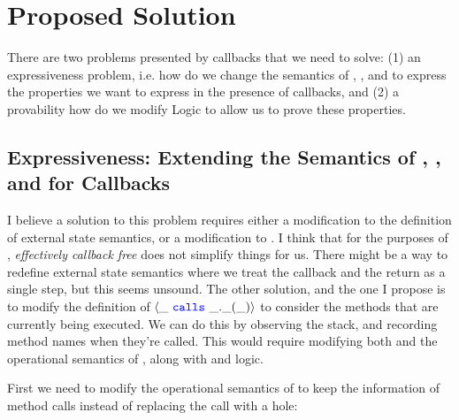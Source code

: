 \documentclass[11pt]{article} %
\begin{document}
\section{Proposed Solution}
There are two problems presented by callbacks that we need 
to solve: (1) an expressiveness problem, i.e. how do we change 
the semantics of \Loo, \SpecO, and \Nec to express the properties
we want to express in the presence of callbacks, and (2) a provability
how do we modify \Nec Logic to allow us to prove these properties.

\subsection{Expressiveness: Extending the Semantics of \Loo, \SpecO, and \Nec for Callbacks}
I believe a solution to this problem requires either a 
modification to the definition of external state semantics, or 
a modification to \SpecO.
I think that for the purposes of \Nec, \emph{effectively callback free} does not
simplify things for us. There might be a way 
to redefine external state semantics where we treat the callback and 
the return as a single step, but this seems unsound. The other solution, and 
the one I propose is to modify the definition of $\langle \_\ {\color{blue}\texttt{calls}}\ \_.\_(\_) \rangle$ to consider
the methods that are currently being executed. We can do this by observing the
stack, and recording method names when they're called. This would require modifying
both \SpecO and the operational semantics of \Loo, along with \Nec and \Nec logic.

First we need to modify the operational semantics of \Loo to keep the 
information of method calls instead of replacing the call with a hole:
\end{document}
